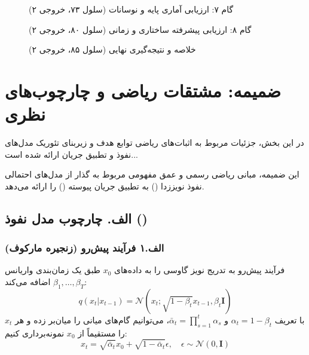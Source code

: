 \begin{figure}[H]
    \centering
    \caption{گام ۷: ارزیابی آماری پایه و نوسانات (سلول ۷۳، خروجی ۲)}
\end{figure}

\begin{figure}[H]
    \centering
    \caption{گام ۸: ارزیابی پیشرفته ساختاری و زمانی (سلول ۸۰، خروجی ۲)}
\end{figure}

\begin{figure}[H]
    \centering
    \caption{خلاصه و نتیجه‌گیری نهایی (سلول ۸۵، خروجی ۲)}
\end{figure}

\newpage
\appendix
\section{ضمیمه: مشتقات ریاضی و چارچوب‌های نظری}
در این بخش، جزئیات مربوط به اثبات‌های ریاضی توابع هدف و زیربنای تئوریک مدل‌های نفوذ و تطبیق جریان ارائه شده است...


این ضمیمه، مبانی ریاضی رسمی و عمق مفهومی مربوط به گذار از مدل‌های احتمالی نفوذ نویززدا () به تطبیق جریان پیوسته () را ارائه می‌دهد.

\subsection{الف. چارچوب مدل نفوذ ()}

\subsubsection{الف.۱ فرآیند پیش‌رو (زنجیره مارکوف)}
فرآیند پیش‌رو به تدریج نویز گاوسی را به داده‌های $x_0$ طبق یک زمان‌بندی واریانس $\beta_1, \dots, \beta_T$ اضافه می‌کند:
\begin{equation}
    q(x_t | x_{t-1}) = \mathcal{N}(x_t; \sqrt{1 - \beta_t} x_{t-1}, \beta_t \mathbf{I})
\end{equation}
با تعریف $\alpha_t = 1 - \beta_t$ و $\bar{\alpha}_t = \prod_{s=1}^t \alpha_s$، می‌توانیم گام‌های میانی را میان‌بر زده و هر $x_t$ را مستقیماً از $x_0$ نمونه‌برداری کنیم:
\begin{equation}
    x_t = \sqrt{\bar{\alpha}_t} x_0 + \sqrt{1 - \bar{\alpha}_t} \epsilon, \quad \epsilon \sim \mathcal{N}(0, \mathbf{I})
\end{equation}

